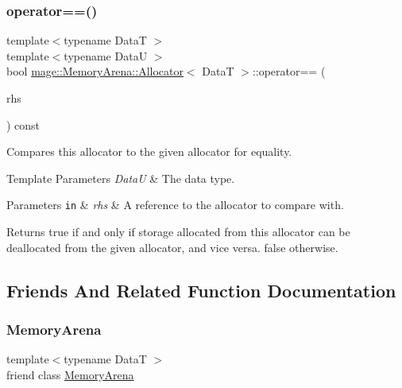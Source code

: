 \subsubsection{\texorpdfstring{operator==()}{operator==()}}
{\footnotesize\ttfamily template$<$typename DataT $>$ \\
template$<$typename DataU $>$ \\
bool \hyperlink{structmage_1_1_memory_arena_1_1_allocator}{mage\+::\+Memory\+Arena\+::\+Allocator}$<$ DataT $>$\+::operator== (\begin{DoxyParamCaption}\item[{const \hyperlink{structmage_1_1_memory_arena_1_1_allocator}{Allocator}$<$ DataU $>$ \&}]{rhs }\end{DoxyParamCaption}) const\hspace{0.3cm}{\ttfamily [noexcept]}}

Compares this allocator to the given allocator for equality.


\begin{DoxyTemplParams}{Template Parameters}
{\em DataU} & The data type. \\
\hline
\end{DoxyTemplParams}

\begin{DoxyParams}[1]{Parameters}
\mbox{\tt in}  & {\em rhs} & A reference to the allocator to compare with. \\
\hline
\end{DoxyParams}
\begin{DoxyReturn}{Returns}
{\ttfamily true} if and only if storage allocated from this allocator can be deallocated from the given allocator, and vice versa. {\ttfamily false} otherwise. 
\end{DoxyReturn}


\subsection{Friends And Related Function Documentation}
\hypertarget{structmage_1_1_memory_arena_1_1_allocator_a934e79307a45b6e72da26d1f10079550}{}\label{structmage_1_1_memory_arena_1_1_allocator_a934e79307a45b6e72da26d1f10079550} 
\subsubsection{\texorpdfstring{Memory\+Arena}{MemoryArena}}
{\footnotesize\ttfamily template$<$typename DataT $>$ \\
friend class \hyperlink{classmage_1_1_memory_arena}{Memory\+Arena}\hspace{0.3cm}{\ttfamily [friend]}}



